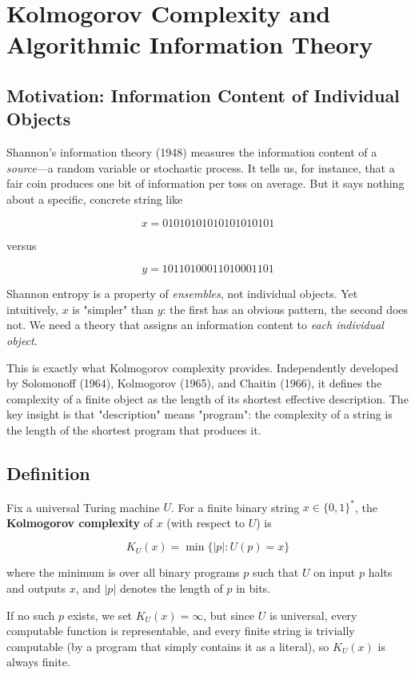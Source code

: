 \chapter{Kolmogorov Complexity and Algorithmic Information Theory}

\section{Motivation: Information Content of Individual Objects}

Shannon's information theory (1948) measures the information content of a \textit{source}—a random variable or stochastic process. It tells us, for instance, that a fair coin produces one bit of information per toss on average. But it says nothing about a specific, concrete string like

\[x = 01010101010101010101\]

versus

\[y = 10110100011010001101\]

Shannon entropy is a property of \textit{ensembles}, not individual objects. Yet intuitively, $x$ is "simpler" than $y$: the first has an obvious pattern, the second does not. We need a theory that assigns an information content to \textit{each individual object}.

This is exactly what Kolmogorov complexity provides. Independently developed by Solomonoff (1964), Kolmogorov (1965), and Chaitin (1966), it defines the complexity of a finite object as the length of its shortest effective description. The key insight is that "description" means "program": the complexity of a string is the length of the shortest program that produces it.



\section{Definition}

Fix a universal Turing machine $U$. For a finite binary string $x \in \{ 0,1\} ^*$, the \textbf{Kolmogorov complexity} of $x$ (with respect to $U$) is

\[K_U(x) = \min\{ |p| : U(p) = x\} \]

where the minimum is over all binary programs $p$ such that $U$ on input $p$ halts and outputs $x$, and $|p|$ denotes the length of $p$ in bits.

If no such $p$ exists, we set $K_U(x) = \infty$, but since $U$ is universal, every computable function is representable, and every finite string is trivially computable (by a program that simply contains it as a literal), so $K_U(x)$ is always finite.

